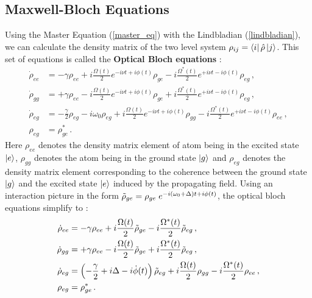 \subsection{Maxwell-Bloch Equations}
Using the Master Equation (\ref{master_eq}) with the Lindbladian (\ref{lindbladian}), we can calculate the density matrix of the two level system $\rho_{ij} = \bra{i} \hat{\rho} \ket{j}$. This set of equations is called the \textbf{Optical Bloch equations} \cite{bloch2004licht, reiser2014time}:
\begin{subequations}
\begin{align}
    \dot{\rho}_{ee} &= -\gamma \rho_{ee} + i \frac{\Omega(t)}{2} e^{-i \nu t + i \phi(t)} \rho_{ge} - i \frac{\Omega^*(t)}{2} e^{+i \nu t - i \phi(t)} \rho_{eg} \, ,\\
    \dot{\rho}_{gg} &= +\gamma \rho_{ee} - i \frac{\Omega(t)}{2} e^{-i \nu t + i \phi(t)} \rho_{ge} + i \frac{\Omega^*(t)}{2} e^{+i \nu t - i \phi(t)} \rho_{eg} \, ,\\
    \dot{\rho}_{eg} &= - \frac{\gamma}{2} \rho_{eg} - i \omega_0 \rho_{eg} + i \frac{\Omega(t)}{2} e^{-i \nu t + i \phi(t)} \rho_{gg} - i \frac{\Omega^*(t)}{2} e^{+i \nu t - i \phi(t)} \rho_{ee}\, , \\
    \rho_{eg} &= \rho^*_{ge}\, .
\end{align}
\end{subequations}
Here $\rho_{ee}$ denotes the density matrix element of atom being in the excited state $\ket{e}$, $\rho_{gg}$ denotes the atom being in the ground state $\ket{g}$ and $\rho_{eg}$ denotes the density matrix element corresponding to the coherence between the ground state $\ket{g}$ and the excited state $\ket{e}$ induced by the propagating field. Using an interaction picture in the form $\Tilde{\rho}_{ge} = \rho_{ge}\; e^{-i(\omega_0 + \Delta)t + i\phi(t)}$, the optical bloch equations simplify to \cite{Scully_Zubairy_1997, reiser2014time}:
\begin{subequations}
\begin{align}
    \dot{\rho}_{ee} &= -\gamma \rho_{ee} + i \frac{\Omega(t)}{2} \Tilde{\rho}_{ge} - i \frac{\Omega^*(t)}{2} \Tilde{\rho}_{eg}\, , \label{rhoee} \\
    \dot{\rho}_{gg} &= +\gamma \rho_{ee} - i \frac{\Omega(t)}{2} \Tilde{\rho}_{ge} + i \frac{\Omega^*(t)}{2} \Tilde{\rho}_{eg}\, ,\label{rhogg} \\
    \dot{\rho}_{eg} &= \left( -\frac{\gamma}{2} + i\Delta -i\dot{\phi}(t) \right) \Tilde{\rho}_{eg} + i\frac{\Omega(t)}{2} \rho_{gg} - i\frac{\Omega^*(t)}{2} \rho_{ee} \label{rhoeg}\, , \\
    \rho_{eg} &= \rho^*_{ge}\, . \label{rhoge}
\end{align}
\end{subequations}
